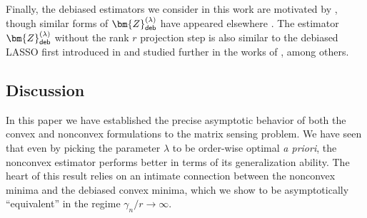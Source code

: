 \documentclass[10pt]{article}
\theoremstyle{definition}
\begin{document}
Finally, the debiased estimators we consider in this work are motivated by \citet{chen_inference_2019}, though similar forms of $\bm{Z}_{{\sf deb}}^{(\lambda)}$ have appeared elsewhere \citep{xia_confidence_2019,cai_geometric_2016}.  The estimator $\bm{Z}_{{\sf deb}}^{(\lambda)}$ without the rank $r$ projection step is also similar to the debiased LASSO first introduced in \citep{zhang_confidence_2014} and studied further in the works of \citet{javanmard_confidence_2014,javanmard_debiasing_2018,miolane_distribution_2021,celentano_lasso_2023}, among others.





\subsection{Discussion} \label{sec:discussion}
In this paper we have established the precise asymptotic behavior of both the convex and nonconvex formulations to the matrix sensing problem.  We have seen that even by picking the parameter $\lambda$ to be order-wise optimal  \emph{a priori}, the nonconvex estimator performs better in terms of its generalization ability.  The heart of this result relies on an intimate connection between the nonconvex minima and the debiased convex minima, which we show to be asymptotically ``equivalent'' in the regime $\gamma_n/r \to \infty$. 
\end{document}
